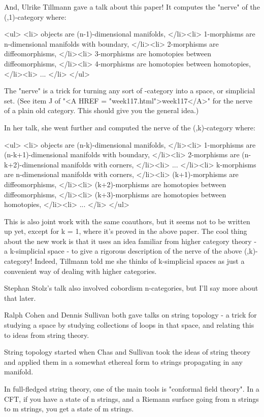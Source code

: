 And, Ulrike Tillmann gave a talk about this paper!  It computes
the "nerve" of the (\infty ,1)-category where:

<ul>
<li>
 objects are (n-1)-dimensional manifolds,
</li><li>
 1-morphisms are n-dimensional manifolds with boundary,
</li><li>
 2-morphisms are diffeomorphisms,
</li><li>
 3-morphisms are homotopies between diffeomorphisms,
</li><li>
 4-morphisms are homotopies between homotopies,
</li><li>
...
</li>
</ul>

The "nerve" is a trick for turning any sort of
\infty -category into a space, or simplicial set.  (See item J of
"<A HREF = "week117.html">week117</A>" for the nerve of a
plain old category.  This should give you the general idea.)

In her talk, she went further and computed the nerve of 
the (\infty ,k)-category where:

<ul>
<li>
 objects are (n-k)-dimensional manifolds,
</li><li>
 1-morphisms are (n-k+1)-dimensional manifolds with boundary,
</li><li>
 2-morphisms are (n-k+2)-dimensional manifolds with corners,
</li><li>
...
</li><li>
 k-morphisms are n-dimensional manifolds with corners,
</li><li>
 (k+1)-morphisms are diffeomorphisms,
</li><li>
 (k+2)-morphisms are homotopies between diffeomorphisms,
</li><li>
 (k+3)-morphisms are homotopies between homotopies,
</li><li>
...
</li>
</ul>

This is also joint work with the same coauthors, but it
seems not to be written up yet, except for k = 1, where it's
proved in the above paper.  The cool thing about the new work
is that it uses an idea familiar from higher category theory - a 
k-simplicial space - to give a rigorous description of the 
nerve of the above (\infty ,k)-category!  Indeed, Tillmann
told me she thinks of k-simplicial spaces as just a convenient
way of dealing with higher categories.

Stephan Stolz's talk also involved cobordism n-categories,
but I'll say more about that later.

Ralph Cohen and Dennis Sullivan both gave talks on string 
topology - a trick for studying a space by studying collections
of loops in that space, and relating this to ideas from string 
theory.  

String topology started when Chas and Sullivan took the ideas
of string theory and applied them in a somewhat ethereal form to
strings propagating in any manifold.  

In full-fledged string theory, one of the main tools is "conformal
field theory".  In a CFT, if you have a state of n strings, and a 
Riemann surface going from n strings to m strings, you get a state 
of m strings.   

